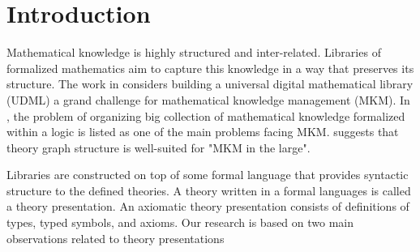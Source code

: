 \section{Introduction}
\label{sec:intro}
Mathematical knowledge is highly structured and inter-related. Libraries of formalized mathematics aim 
to capture this knowledge in a way that preserves its structure. The work in \cite{farmer2004mkm} 
considers building a universal digital mathematical library (UDML) a grand challenge for 
mathematical knowledge management (MKM). 
In \cite{piroi2007organisational}, the problem of organizing big collection of mathematical 
knowledge formalized within a logic is listed as one of the main problems facing MKM. 
\cite{kohlhase2010towards} suggests that theory graph structure is well-suited for "MKM in the 
large". 

Libraries are constructed on top of some formal language that provides syntactic 
structure to the defined theories. A theory written in a formal languages is called a theory presentation. 
An axiomatic theory presentation consists of definitions of types, typed symbols, and axioms. Our 
research is based on two main observations related to 
theory presentations


